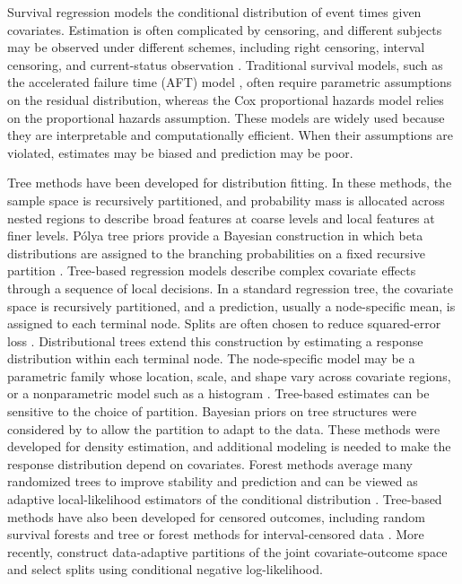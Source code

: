 \documentclass[11pt]{article}
\numberwithin{equation}{section}
\begin{document}
Survival regression models the conditional distribution of event times given covariates. Estimation is often complicated by censoring, and different subjects may be observed under different schemes, including right censoring, interval censoring, and current-status observation \citep{lawless_statistical_2003,sun_statistical_2006, kleinbaum_survival_2012}. Traditional survival models, such as the accelerated failure time (AFT) model \citep{lawless_statistical_2003}, often require parametric assumptions on the residual distribution, whereas the Cox proportional hazards model \citep{cox_regression_1972} relies on the proportional hazards assumption. These models are widely used because they are interpretable and computationally efficient. When their assumptions are violated, estimates may be biased and prediction may be poor.

Tree methods have been developed for distribution fitting. In these methods, the sample space is recursively partitioned, and probability mass is allocated across nested regions to describe broad features at coarse levels and local features at finer levels. P\'olya tree priors provide a Bayesian construction in which beta distributions are assigned to the branching probabilities on a fixed recursive partition \citep{mauldin_polya_1992,lavine_aspects_1992}. Tree-based regression models describe complex covariate effects through a sequence of local decisions. In a standard regression tree, the covariate space is recursively partitioned, and a prediction, usually a node-specific mean, is assigned to each terminal node. Splits are often chosen to reduce squared-error loss \citep{taylor_splitting_1996,loh_classification_2011}. Distributional trees extend this construction by estimating a response distribution within each terminal node. The node-specific model may be a parametric family whose location, scale, and shape vary across covariate regions, or a nonparametric model such as a histogram \citep{zeileis_model-based_2008,schlosser_distributional_2019,yang_conditional_2024}. Tree-based estimates can be sensitive to the choice of partition. Bayesian priors on tree structures were considered by \citet{wong_optional_2010,awaya_hidden_2024} to allow the partition to adapt to the data. These methods were developed for density estimation, and additional modeling is needed to make the response distribution depend on covariates. Forest methods average many randomized trees to improve stability and prediction and can be viewed as adaptive local-likelihood estimators of the conditional distribution \citep{schlosser_distributional_2019,hothorn_predictive_2021}. Tree-based methods have also been developed for censored outcomes, including random survival forests \citep{ishwaran_random_2008} and tree or forest methods for interval-censored data \citep{fu_survival_2017,yao_ensemble_2021}. More recently, \citet{angelim_partition_2026} construct data-adaptive partitions of the joint covariate-outcome space and select splits using conditional negative log-likelihood.
\end{document}
